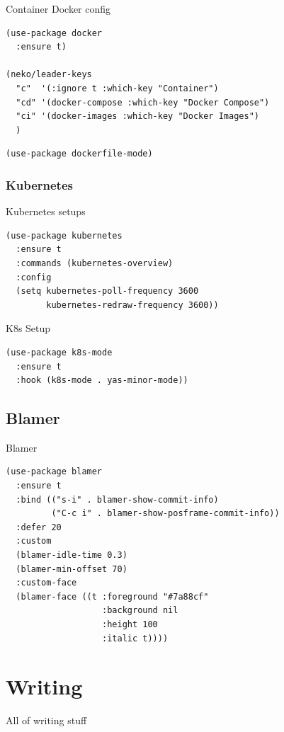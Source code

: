 \documentclass[11pt]{article}
\begin{document}
Container Docker config

\begin{verbatim}
(use-package docker
  :ensure t)

(neko/leader-keys
  "c"  '(:ignore t :which-key "Container")
  "cd" '(docker-compose :which-key "Docker Compose")
  "ci" '(docker-images :which-key "Docker Images")
  )
\end{verbatim}


\begin{verbatim}
(use-package dockerfile-mode)
\end{verbatim}

\subsubsection{Kubernetes}
\label{sec:org0e22fc5}

Kubernetes setups

\begin{verbatim}
(use-package kubernetes
  :ensure t
  :commands (kubernetes-overview)
  :config
  (setq kubernetes-poll-frequency 3600
        kubernetes-redraw-frequency 3600))
\end{verbatim}

K8s Setup

\begin{verbatim}
(use-package k8s-mode
  :ensure t
  :hook (k8s-mode . yas-minor-mode))
\end{verbatim}

\subsection{Blamer}
\label{sec:org0c063db}

Blamer

\begin{verbatim}
(use-package blamer
  :ensure t
  :bind (("s-i" . blamer-show-commit-info)
         ("C-c i" . blamer-show-posframe-commit-info))
  :defer 20
  :custom
  (blamer-idle-time 0.3)
  (blamer-min-offset 70)
  :custom-face
  (blamer-face ((t :foreground "#7a88cf"
                   :background nil
                   :height 100
                   :italic t))))
\end{verbatim}

\section{Writing}
\label{sec:orgb9142b1}

All of writing stuff
\end{document}
